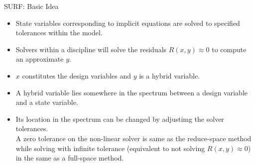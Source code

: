 \documentclass{beamer}
\begin{document}
  \begin{frame}{SURF: Basic Idea}
    \vspace{-10mm}
    \begin{itemize}
      \item State variables corresponding to implicit equations are solved to specified tolerances within the model.
      \item Solvers within a discipline will solve the residuals $R(x,y) \approx 0$ to compute an approximate $y$.
      \item $x$ constitutes the design variables and $y$ is a hybrid variable.
      \item A hybrid variable lies somewhere in the spectrum between a design variable and a state variable.
      \item Its location in the spectrum can be changed by adjustimg the solver tolerances. \\A zero tolerance on the non-linear solver is same as the reduce-space method while solving with infinite tolerance (equivalent to not solving $R(x,y) \approx 0$) in the same as a full-space method.
    \end{itemize}
  \end{frame}
  
\end{document}
